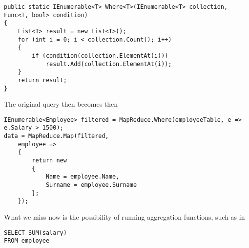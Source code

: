 \begin{lstlisting}
public static IEnumerable<T> Where<T>(IEnumerable<T> collection, 	Func<T, bool> condition)
{
	List<T> result = new List<T>();
	for (int i = 0; i < collection.Count(); i++)
	{
		if (condition(collection.ElementAt(i)))
			result.Add(collection.ElementAt(i));
	}
	return result;
}
\end{lstlisting}

\noindent
The original query then becomes then

\begin{lstlisting}
IEnumerable<Employee> filtered = MapReduce.Where(employeeTable, e => e.Salary > 1500);
data = MapReduce.Map(filtered,
	employee =>
	{
		return new
		{
			Name = employee.Name,
			Surname = employee.Surname
		};
	});
\end{lstlisting}

\noindent
What we miss now is the possibility of running aggregation functions, such as in

\begin{lstlisting}
SELECT SUM(salary)
FROM employee
\end{lstlisting}




